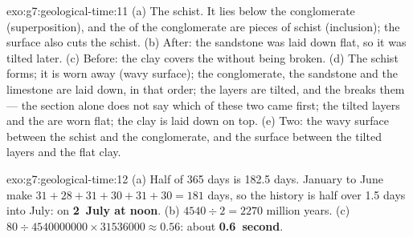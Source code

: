 \begin{solution}{exo:g7:geological-time:11}
(a) The schist. It lies below the conglomerate (superposition), and the
 of the conglomerate are pieces of schist (inclusion); the
 surface also cuts the schist. (b) After: the sandstone was laid
down flat, so it was tilted later. (c) Before: the clay covers the 
without being broken. (d) The schist forms; it is worn away (wavy
surface); the conglomerate, the sandstone and the limestone are laid
down, in that order; the layers are tilted, and the  breaks them
--- the section alone does not say which of these two came first; the
tilted layers and the  are worn flat; the clay is laid down on top.
(e) Two: the wavy surface between the schist and the conglomerate, and
the surface between the tilted layers and the flat clay.
\end{solution}

\begin{solution}{exo:g7:geological-time:12}
(a) Half of 365 days is 182.5 days. January to June make
$31+28+31+30+31+30 = 181$ days, so the history is half over 1.5 days
into July: on \textbf{2~July at noon}. (b) $4540 \div 2 = 2270$ million
years. (c) $80 \div \num{4540000000} \times \num{31536000} \approx 0.56$:
about \textbf{0.6~second}.
\end{solution}

